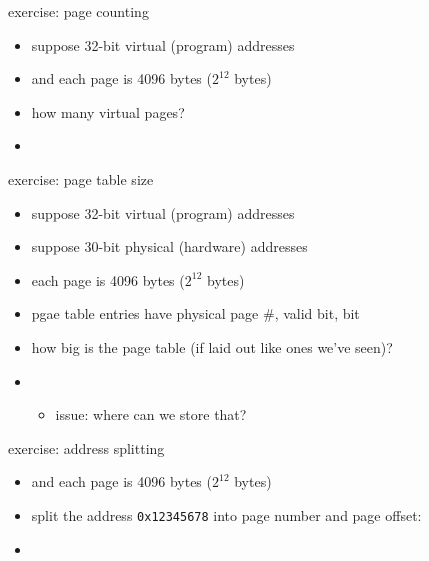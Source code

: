 \begin{frame}{exercise: page counting}
    \begin{itemize}
        \item suppose 32-bit virtual (program) addresses
        \item and each page is 4096 bytes ($2^{12}$ bytes)
            \vspace{.5cm}
        \item how many virtual pages?
        \item<2-> \iftoggle{heldback}{}{$2^{32} / 2^{12} = 2^{20}$}
    \end{itemize}
\end{frame}

\begin{frame}{exercise: page table size}
    \begin{itemize}
        \item suppose 32-bit virtual (program) addresses
        \item suppose 30-bit physical (hardware) addresses
        \item each page is 4096 bytes ($2^{12}$ bytes)
        \item pgae table entries have physical page \#, valid bit, bit
            \vspace{.5cm}
        \item how big is the page table (if laid out like ones we've seen)? 
        \item<2-> \iftoggle{heldback}{}{$2^{20}$ entries $\times (18 + 1)$ bits per entry}
            \begin{itemize}
            \item issue: where can we store that?
            \end{itemize}
    \end{itemize}
\end{frame}

\begin{frame}{exercise: address splitting}
    \begin{itemize}
    \item and each page is 4096 bytes ($2^{12}$ bytes)
    \item split the address {\tt 0x12345678} into page number and page offset:
    \item<2-> \iftoggle{heldback}{}{page \#: {\tt0x12345}; offset: {\tt 0x678}}
    \end{itemize}
\end{frame}
